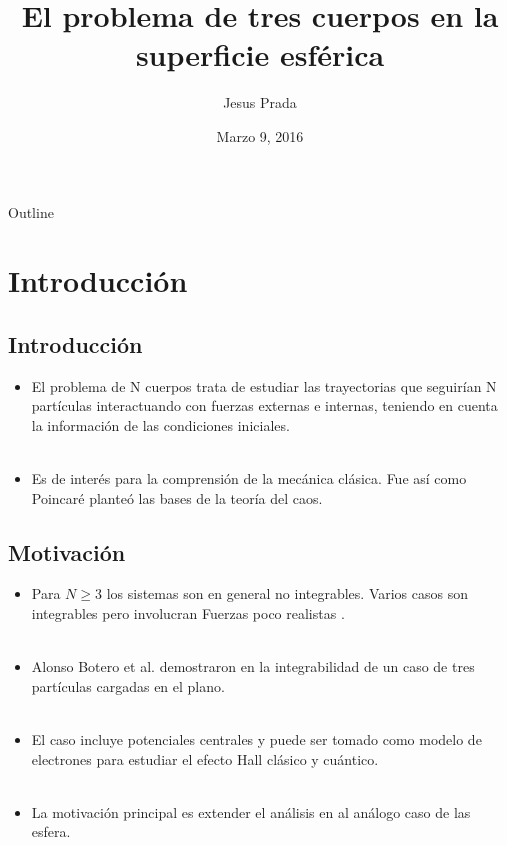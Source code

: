 \documentclass[xcolor=dvipsnames]{beamer}
\title{\textbf{El problema de tres cuerpos en la superficie esférica}}
\author{Jesus Prada}
\institute[{\color{Black} Universidad de los Andes}] %
{
 \vspace{5mm} \normalsize Advisor: PhD Alonso Botero \\ \vspace{6mm} \small  Universidad de los Andes, Departamento de F\'isica
}
\date{ \footnotesize Marzo 9, 2016}
\begin{document}
\begin{frame}
  \titlepage
\end{frame}
\begin{frame}{Outline}
 \tableofcontents
\end{frame}
\section{Introducción}
\subsection{Introducción}
\begin{frame}
\begin{itemize}
\item El problema de N cuerpos trata de estudiar las trayectorias que seguir\'ian N partículas interactuando con fuerzas externas e internas, teniendo en cuenta la informaci\'on de las condiciones iniciales.\\~\\ 
\item Es de inter\'es para la comprensi\'on de la mec\'anica cl\'asica. Fue as\'i como Poincar\'e plante\'o las bases de la teor\'ia del caos. \cite{poincare}
\end{itemize}
\end{frame}
\subsection{Motivación}
\begin{frame}
\begin{itemize}
\item Para $N\geq 3$ los sistemas son en general no integrables. Varios casos son integrables pero involucran Fuerzas poco realistas \cite{strangeCases}.\\~\\ 
\item Alonso Botero et al. demostraron en \cite{alonso} la integrabilidad de un caso de tres partículas cargadas en el plano.\\~\\ 
\item El caso incluye potenciales centrales y puede ser tomado como modelo de electrones para estudiar el efecto Hall clásico y cuántico.\\~\\ 
\item La motivación principal es extender el análisis en \cite{alonso} al análogo caso de las esfera.\\~\\
\end{itemize}
\end{frame}
\end{document}
